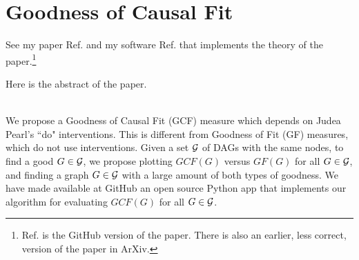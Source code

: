 \chapter{Goodness of Causal Fit}
\label{ch-good-causal-fit}
See my paper Ref.\cite{tucci-gcf}
and my software  Ref.\cite{tucci-dag-lie-det}
that implements the theory of the paper.\footnote{Ref.\cite{tucci-gcf} is the GitHub version of the paper. There is also an earlier, less correct, version of the paper in ArXiv.}
 

Here is the abstract of the paper.

\\
We propose a 
Goodness of Causal Fit (GCF) measure
which depends 
on Judea Pearl's ``do" interventions.
This is different
from Goodness of Fit (GF) measures,
which do not use interventions.
Given a set ${\cal G}$
of DAGs with the same nodes,
to find a good $G\in {\cal G}$,
we propose plotting
$GCF(G)$ versus $GF(G)$
for all $G\in {\cal G}$,
and finding a 
graph $G\in {\cal G}$  with 
a large amount 
of both types of goodness.
We have made 
available at GitHub
an open source Python app that implements
our algorithm for evaluating
$GCF(G)$ for all $G\in{\cal G}$.
